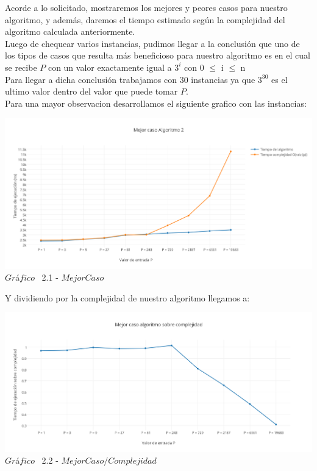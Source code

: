 \indent Acorde a lo solicitado, mostraremos los mejores y peores casos para nuestro algoritmo, y adem\'as, daremos el tiempo estimado 
seg\'un la complejidad del algoritmo calculada anteriormente.\\

Luego de chequear varios instancias, pudimos llegar a la conclusi\'on que uno de los tipos de casos que resulta m\'as beneficioso para nuestro algoritmo
es en el cual se recibe $P$ con un valor exactamente igual a $3^i$ con 0 $\leq$ i $\leq$ n \\

Para llegar a dicha conclusi\'on trabajamos con 30 instancias ya que $3^{30}$ es el ultimo valor dentro del valor que puede tomar $P$.\\

Para una mayor observacion desarrollamos el siguiente grafico con las instancias:\\

\vspace*{0.3cm} \vspace*{0.3cm}
  \begin{center}
 \includegraphics[scale=0.65]{./EJ2/mejorcaso.png}
 {$Gr$\'a$fico$ \ 2.1 - $Mejor Caso$}
  \end{center}
  \vspace*{0.3cm}
  
Y dividiendo por la complejidad de nuestro algoritmo llegamos a:\\

\vspace*{0.3cm} \vspace*{0.3cm}
  \begin{center}
\includegraphics[scale=0.65]{./EJ2/mejorcaso2.png}
{$Gr$\'a$fico$ \ 2.2 - $Mejor Caso / Complejidad$}
  \end{center}
  \vspace*{0.3cm}


